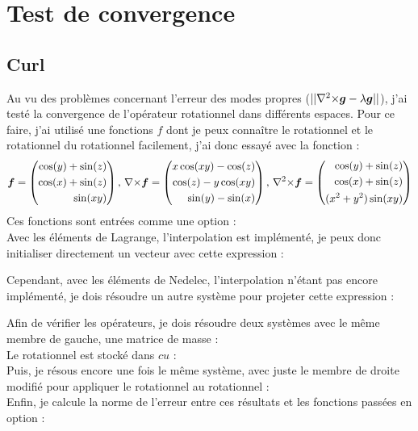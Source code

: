 \chapter{Test de convergence}
\section{Curl}
Au vu des problèmes concernant l'erreur des modes propres ($||{\nabla^2\times}\bm{g}-\lambda\bm{g}||$), j'ai testé la convergence de l'opérateur rotationnel dans différents espaces. Pour ce faire, j'ai utilisé une fonctions $f$ dont je peux connaître le rotationnel et le rotationnel du rotationnel facilement, j'ai donc essayé avec la fonction :
\[ \bm{f}=\left(\begin{aligned}
\cos(y)+\sin(z)\\
\cos(x)+\sin(z)\\
\sin(xy)
\end{aligned}\right)\text{, }
{\nabla\times}\bm{f}=\left(\begin{aligned}
x\cos(xy)-\cos(z)\\
\cos(z)-y\cos(xy)\\
\sin(y)-\sin(x)
\end{aligned}\right)\text{, }
{\nabla^2\times}\bm{f}=\left(\begin{aligned}
\cos(y)+\sin(z)\\
\cos(x)+\sin(z)\\
(x^2+y^2)\sin(xy)
\end{aligned}\right) \]
Ces fonctions sont entrées comme une option :\\

Avec les éléments de Lagrange, l'interpolation est implémenté, je peux donc initialiser directement un vecteur avec cette expression :

Cependant, avec les éléments de Nedelec, l'interpolation n'étant pas encore implémenté, je dois résoudre un autre système pour projeter cette expression :

Afin de vérifier les opérateurs, je dois résoudre deux systèmes avec le même membre de gauche, une matrice de masse :\\

Le rotationnel est stocké dans $cu$ :\\

Puis, je résous encore une fois le même système, avec juste le membre de droite modifié pour appliquer le rotationnel au rotationnel :\\

Enfin, je calcule la norme de l'erreur entre ces résultats et les fonctions passées en option :\\



